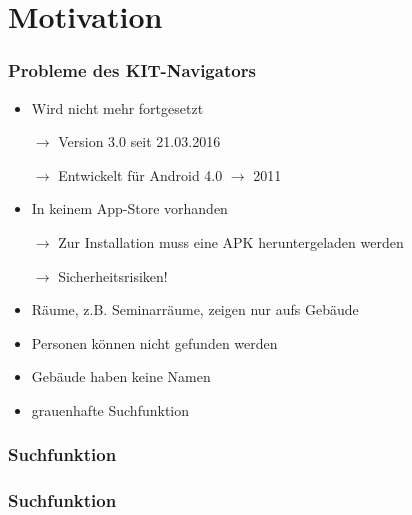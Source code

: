 \section{Motivation}

\begin{frame}\frametitle{Probleme des KIT-Navigators}
    \begin{itemize}
        \item Wird nicht mehr fortgesetzt
        \item[$\rightarrow$] Version 3.0 seit 21.03.2016
        \item[$\rightarrow$] Entwickelt für Android 4.0 $\rightarrow$ 2011
        \item In keinem App-Store vorhanden
        \item[$\rightarrow$] Zur Installation muss eine APK heruntergeladen werden
        \item[$\rightarrow$] Sicherheitsrisiken!
        \item Räume, z.B. Seminarräume, zeigen nur aufs Gebäude
        \item Personen können nicht gefunden werden
        \item Gebäude haben keine Namen
        \item grauenhafte Suchfunktion
    \end{itemize}
\end{frame}

\begin{frame}\frametitle{Suchfunktion}
    \begin{minipage}{\textwidth}
        \begin{minipage}{.49\textwidth}
            \centering
        \end{minipage}
        \begin{minipage}{.49\textwidth}
            \centering
        \end{minipage}
    \end{minipage}
\end{frame}

\begin{frame}\frametitle{Suchfunktion}
    \begin{minipage}{\textwidth}
        \begin{minipage}{.49\textwidth}
            \centering
        \end{minipage}
        \begin{minipage}{.49\textwidth}
            \centering
        \end{minipage}
    \end{minipage}
\end{frame}